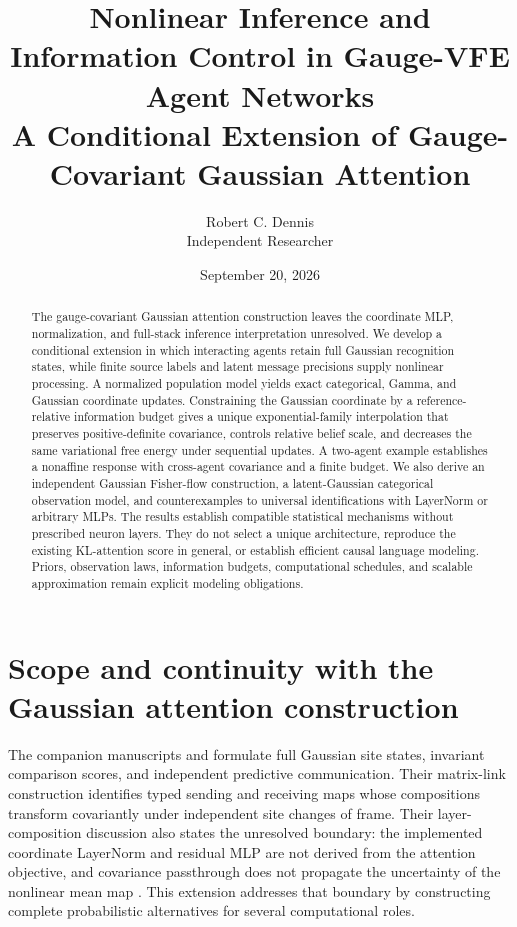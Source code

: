 \documentclass[11pt]{article}
\title{Nonlinear Inference and Information Control in Gauge-VFE Agent Networks\\[0.5em]\large A Conditional Extension of Gauge-Covariant Gaussian Attention}
\author{Robert C. Dennis\\Independent Researcher}
\date{September 20, 2026}
\begin{document}
\maketitle
\begin{abstract}
The gauge-covariant Gaussian attention construction leaves the coordinate MLP, normalization, and full-stack inference interpretation unresolved. We develop a conditional extension in which interacting agents retain full Gaussian recognition states, while finite source labels and latent message precisions supply nonlinear processing. A normalized population model yields exact categorical, Gamma, and Gaussian coordinate updates. Constraining the Gaussian coordinate by a reference-relative information budget gives a unique exponential-family interpolation that preserves positive-definite covariance, controls relative belief scale, and decreases the same variational free energy under sequential updates. A two-agent example establishes a nonaffine response with cross-agent covariance and a finite budget. We also derive an independent Gaussian Fisher-flow construction, a latent-Gaussian categorical observation model, and counterexamples to universal identifications with LayerNorm or arbitrary MLPs. The results establish compatible statistical mechanisms without prescribed neuron layers. They do not select a unique architecture, reproduce the existing KL-attention score in general, or establish efficient causal language modeling. Priors, observation laws, information budgets, computational schedules, and scalable approximation remain explicit modeling obligations.
\end{abstract}

\section{Scope and continuity with the Gaussian attention construction}
\label{sec:scope}

The companion manuscripts  and  formulate full Gaussian site states, invariant comparison scores, and independent predictive communication. Their matrix-link construction identifies typed sending and receiving maps whose compositions transform covariantly under independent site changes of frame. Their layer-composition discussion also states the unresolved boundary: the implemented coordinate LayerNorm and residual MLP are not derived from the attention objective, and covariance passthrough does not propagate the uncertainty of the nonlinear mean map \citep{Dennis2026Attention}. This extension addresses that boundary by constructing complete probabilistic alternatives for several computational roles.
\end{document}
